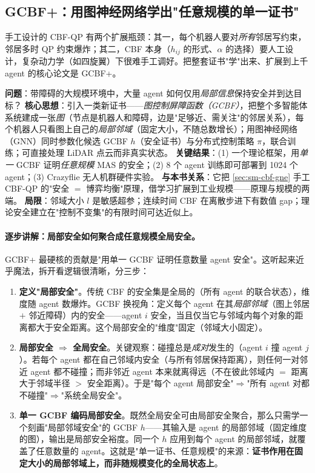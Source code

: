 \subsection{GCBF+：用图神经网络学出"任意规模的单一证书"}
\label{sec:sm-gcbfplus}

手工设计的 CBF-QP 有两个扩展瓶颈：其一，每个机器人要对\emph{所有}邻居写约束，邻居多时 QP 约束爆炸；其二，CBF 本身（$h_{ij}$ 的形式、$\alpha$ 的选择）要人工设计，复杂动力学（如四旋翼）下很难手工调好。把整套证书"学"出来、扩展到上千 agent 的核心论文是 GCBF+\cite{zhang2025gcbfplus}。

\begin{paper}\label{paper:gcbfplus}
\textbf{问题}：带障碍的大规模环境中，大量 agent 如何仅用\emph{局部信息}保持安全并到达目标？
\textbf{核心思想}：引入一类新证书——\emph{图控制屏障函数（GCBF）}，把整个多智能体系统建成一张\emph{图}（节点是机器人和障碍，边是"足够近、需关注"的邻居关系），每个机器人只看图上自己的\emph{局部邻域}（固定大小，不随总数增长）；用图神经网络（GNN）同时参数化候选 GCBF $h$（安全证书）与分布式控制策略 $\pi$，联合训练；可直接处理 LiDAR 点云而非真实状态。
\textbf{关键结果}：(1) 一个理论框架，用\emph{单一} GCBF 证明\emph{任意规模} MAS 的安全；(2) 8 个 agent 训练即可部署到 1024 个 agent；(3) Crazyflie 无人机群硬件实验。
\textbf{与本书关系}：它把 \cref{sec:sm-cbf-gne} 手工 CBF-QP 的"安全 $=$ 博弈均衡"原理，借学习扩展到工业规模——原理与规模的两端。
\textbf{局限}：邻域大小 $l$ 是敏感超参；连续时间 CBF 在离散步进下有数值 gap；理论安全建立在"控制不变集"的有限时间可达近似上。
\end{paper}

\paragraph{逐步讲解：局部安全如何聚合成任意规模全局安全。}
GCBF+ 最硬核的贡献是"用单一 GCBF 证明任意数量 agent 安全"。这听起来近乎魔法，拆开看逻辑很清晰，分三步：
\begin{enumerate}
  \item \textbf{定义"局部安全"}。传统 CBF 的安全集是全局的（所有 agent 的联合状态），维度随 agent 数爆炸。GCBF 换视角：定义每个 agent 在其\emph{局部邻域}（图上邻居 $+$ 邻近障碍）内的安全——agent $i$ 安全，当且仅当它与邻域内每个对象的距离都大于安全距离。这个局部安全的"维度"固定（邻域大小固定）。
  \item \textbf{局部安全 $\Rightarrow$ 全局安全}。关键观察：碰撞总是\emph{成对}发生的（agent $i$ 撞 agent $j$）。若每个 agent 都在自己邻域内安全（与所有邻居保持距离），则任何一对邻近 agent 都不碰撞；而非邻近 agent 本来就离得远（不在彼此邻域内 $=$ 距离大于邻域半径 $>$ 安全距离）。于是"每个 agent 局部安全"$\Rightarrow$"所有 agent 对都不碰撞"$\Rightarrow$"系统全局安全"。
  \item \textbf{单一 GCBF 编码局部安全}。既然全局安全可由局部安全聚合，那么只需学一个刻画"局部邻域安全"的 GCBF $h$——其输入是 agent 的局部邻域（固定维度的图），输出是局部安全裕度。同一个 $h$ 应用到每个 agent 的局部邻域，就覆盖了任意数量的 agent。这就是"单一证书、任意规模"的来源：\textbf{证书作用在固定大小的局部邻域上，而非随规模变化的全局状态上}。
\end{enumerate}

